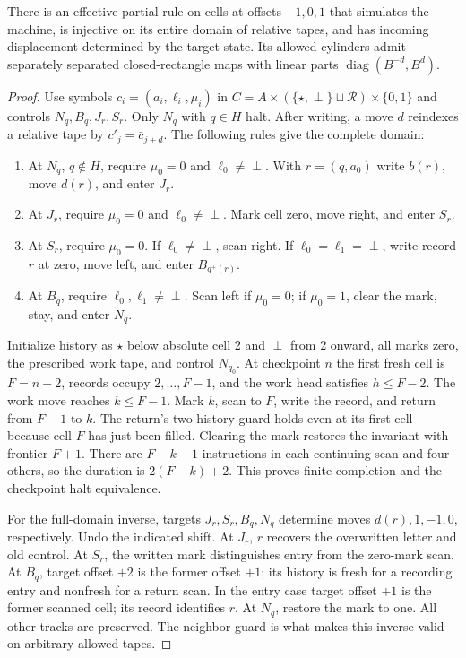 \begin{lemma}\label{ba:fresh-recorder}
There is an effective partial rule on cells at offsets $-1,0,1$ that
simulates the machine, is injective on its entire domain of relative
tapes, and has incoming displacement determined by the target state.
Its allowed cylinders admit separately separated closed-rectangle maps
with linear parts $\operatorname{diag}(B^{-d},B^d)$.
\end{lemma}
\begin{proof}\label{ba:fresh-recorder-proof}
Use symbols $c_i=(a_i,\ell_i,\mu_i)$ in
$C=A\times(\{\star,\perp\}\sqcup\mathcal R)\times\{0,1\}$
and controls $N_q,B_q,J_r,S_r$.  Only $N_q$ with $q\in H$ halt.
After writing, a move $d$ reindexes a relative tape by
$c'_j=\bar c_{j+d}$.  The following rules give the complete domain:
\begin{enumerate}
\item At $N_q$, $q\notin H$, require $\mu_0=0$ and
$\ell_0\ne\perp$.  With $r=(q,a_0)$ write $b(r)$, move $d(r)$,
and enter $J_r$.
\item At $J_r$, require $\mu_0=0$ and $\ell_0\ne\perp$.
Mark cell zero, move right, and enter $S_r$.
\item At $S_r$, require $\mu_0=0$.  If $\ell_0\ne\perp$, scan
right.  If $\ell_0=\ell_1=\perp$, write record $r$ at zero,
move left, and enter $B_{q^+(r)}$.
\item At $B_q$, require $\ell_0,\ell_1\ne\perp$.
Scan left if $\mu_0=0$; if $\mu_0=1$, clear the mark, stay, and
enter $N_q$.
\end{enumerate}
Initialize history as $\star$ below absolute cell 2 and $\perp$ from
2 onward, all marks zero, the prescribed work tape, and control $N_{q_0}$.
At checkpoint $n$ the first fresh cell is $F=n+2$, records occupy
$2,\ldots,F-1$, and the work head satisfies $h\le F-2$.
The work move reaches $k\le F-1$.  Mark $k$, scan to $F$, write the
record, and return from $F-1$ to $k$.  The return's two-history guard
holds even at its first cell because cell $F$ has just been filled.
Clearing the mark restores the invariant with frontier $F+1$.
There are $F-k-1$ instructions in each continuing scan and four others,
so the duration is $2(F-k)+2$.  This proves finite completion and the
checkpoint halt equivalence.

For the full-domain inverse, targets $J_r,S_r,B_q,N_q$ determine moves
$d(r),1,-1,0$, respectively.  Undo the indicated shift.  At $J_r$,
$r$ recovers the overwritten letter and old control.  At $S_r$, the
written mark distinguishes entry from the zero-mark scan.  At $B_q$,
target offset $+2$ is the former offset $+1$; its history is fresh
for a recording entry and nonfresh for a return scan.  In the entry
case target offset $+1$ is the former scanned cell; its record identifies $r$.
At $N_q$, restore the mark to one.  All other tracks are preserved.
The neighbor guard is what makes this inverse valid on arbitrary allowed
tapes.


\end{proof}
